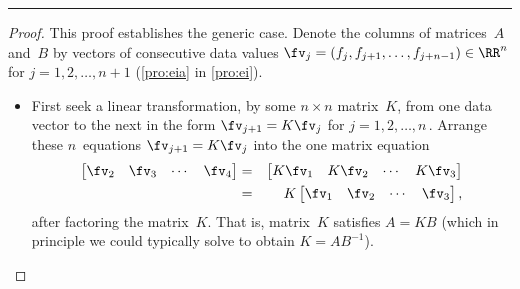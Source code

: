 \begin{reduce}
\begin{table}
\begin{minipage}{\linewidth}
\begin{itemize}
\end{itemize}
\end{minipage}
\hrule
\end{table}

\begin{proof} 
This proof establishes the generic case.
Denote the columns of matrices~\(A\) and~\(B\) by vectors of consecutive data values \(\fv_j=(f_j, f_{j+1},\ldots,f_{j+n-1})\in\RR^n\) for \(j=1,2,\ldots,n+1\) (\autoref{pro:eia} in \autoref{pro:ei}).
\begin{itemize}
\item First seek a linear transformation, by some \(n\times n\) matrix~\(K\), from one data vector to the next in the form \(\fv_{j+1}=K\fv_j\) for \(j=1,2,\ldots,n\)\,.
Arrange these \(n\)~equations \(\fv_{j+1}=K\fv_j\) into the one matrix equation
\begin{eqnarray*}
\begin{bmatrix} \fv_2&\fv_3&\cdots&\fv_4 \end{bmatrix}
&=&\begin{bmatrix} K\fv_1&K\fv_2&\cdots&K\fv_3 \end{bmatrix}
\\&=&K\begin{bmatrix} \fv_1&\fv_2&\cdots&\fv_3 \end{bmatrix},
\end{eqnarray*}
after factoring the matrix~\(K\).
That is, matrix~\(K\) satisfies \(A=KB\) (which in principle we could typically solve to obtain \(K=AB^{-1}\)).


\end{itemize}
\end{proof}
\end{reduce}
